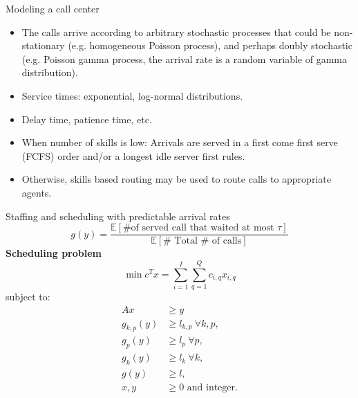 \documentclass{beamer}
\begin{document}
\begin{frame}{Modeling a call center}
	\begin{itemize}
		\item{} The calls arrive according	to arbitrary stochastic processes that could be non-stationary (e.g. homogeneous Poisson process), and perhaps doubly stochastic (e.g. Poisson gamma process, the arrival rate is a random	variable of gamma distribution).
		\item{} Service times: exponential, log-normal distributions.
		\item{} Delay time,  patience time, etc.
		\item{} When number of skills is low: Arrivals are served in a first come first serve (FCFS) order and/or a longest idle server first rules. 
		\item{} Otherwise, {\color{blue}skills based routing} may be used to route calls to appropriate agents.
	\end{itemize}
\end{frame}

\begin{frame}{Staffing and scheduling with predictable arrival rates}
	\[
	g(y) = \frac{\mathbb{E}[\# \text{of served call that waited at most } \tau]}{\mathbb{E}[\# \text{ Total } \# \text{ of calls}]}
	\]
	\textbf{Scheduling problem}	
	\[
	\min {c}^T{x} = \sum_{i=1}^I\sum_{q=1}^Q c_{i,q}x_{i,q}
	\]
	subject to:
	\begin{equation} \tag{P1}
		\begin{aligned}
			{Ax} &\geq {y} \\
			g_{k,p}({y}) &\geq l_{k,p} ~\forall k,p, \\
			g_{p}({y}) &\geq l_{p} ~\forall p, \\
			g_{k}({y}) &\geq l_{k} ~\forall k, \\
			g(y) &\geq l,\\
			{x},{y}&\geq 0 \text{ and integer}  \text{.}\\
		\end{aligned}
	\end{equation}
\end{frame}
\end{document}
